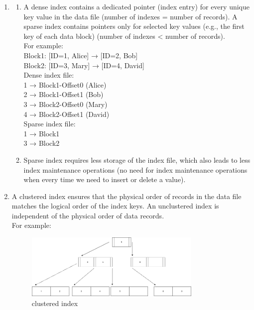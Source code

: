 \documentclass[12pt]{extarticle}
\begin{document}
\begin{flushleft}
\begin{enumerate}
\begin{enumerate}
\item
\begin{enumerate}
\item 
A dense index contains a dedicated pointer (index entry) for every unique key value in the data file (number of indexes = number of records).
A sparse index contains pointers only for selected key values (e.g., the first key of each data block) (number of indexes < number of records). \\
For example: \\
Block1: [ID=1, Alice] → [ID=2, Bob] \\
Block2: [ID=3, Mary] → [ID=4, David] \\
Dense index file: \\
1 → Block1-Offset0 (Alice)  \\
2 → Block1-Offset1 (Bob)  \\
3 → Block2-Offset0 (Mary)  \\
4 → Block2-Offset1 (David)  \\
Sparse index file: \\
1 → Block1  \\
3 → Block2  \\

\item Sparse index requires less storage of the index file, which also leads to less index maintenance operations (no need for index maintenance operations when every time we need to insert or delete a value).
\end{enumerate}

\item A clustered index ensures that the physical order of records in the data file matches the logical order of the index keys.
An unclustered index is independent of the physical order of data records. \\
For example: \\
\begin{figure}[h]
  \centering
  \includegraphics[width=0.8\textwidth]{clustered.drawio.png}
  \caption{clustered index}
\end{figure}


\end{enumerate}
\end{enumerate}
\end{flushleft}
\end{document}
